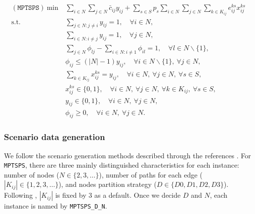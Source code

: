 \begin{subequations}
\begin{align}
(\texttt{MPTSPS})\ \textrm{min}\ &\sum_{i\in N}\sum_{j\in N}\bar{c}_{ij}y_{ij}+\sum_{s\in S}p_s\sum_{i\in N}\sum_{j\in N}\sum_{k\in K_{ij}}e_{ij}^{ks}x_{ij}^{ks} \\
\textrm{s.t.}\ &\sum_{j\in N:j\neq i}y_{ij}=1,\quad\forall i\in N,\\
&\sum_{i\in N:i\neq j}y_{ij}=1,\quad\forall j\in N,\\
&\sum_{j\in N}\phi_{lj}-\sum_{i\in N: i\neq 1}\phi_{il}=1,\quad\forall l\in N\backslash\{1\},\\
&\phi_{ij}\le \left(|N|-1\right)y_{ij},\quad\forall i\in N\backslash\{1\},\ \forall j\in N,\\
&\sum_{k\in K_{ij}}x_{ij}^{ks}=y_{ij},\quad\forall i\in N,\ \forall j\in N,\ \forall s\in S, \\
&x_{ij}^{ks}\in\{0,1\},\quad\forall i\in N,\ \forall j\in N,\ \forall k\in K_{ij},\ \forall s\in S,\\
&y_{ij}\in \{0,1\},\quad \forall i\in N,\ \forall j\in N,\\
&\phi_{ij} \ge 0, \quad \forall i\in N,\ \forall j\in N.
\end{align}
\end{subequations}

\subsubsection{Scenario data generation}
We follow the scenario generation methods described through the references \cite{journal:MPT2014,journal:PGM2017,journal:TPP2017}. For \texttt{MPTSPS}, there are three mainly distinguished characteristics for each instance: number of nodes ($N\in\{2,3,\ldots\}$), number of paths for each edge ($|K_{ij}|\in\{1,2,3,\ldots\}$), and nodes partition strategy ($D\in\{D0,D1,D2,D3\}$). Following \cite{journal:TPP2017}, $|K_{ij}|$ is fixed by 3 as a default. Once we decide $D$ and $N$, each instance is named by \texttt{MPTSPS\_D\_N}. 

